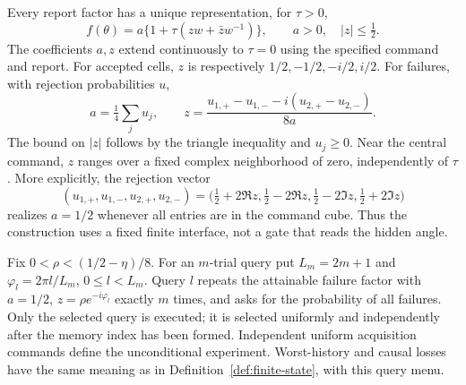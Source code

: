 \documentclass[11pt]{amsart}
\theoremstyle{definition}\newtheorem{definition}[theorem]{Definition}
\theoremstyle{remark}\newtheorem{remark}[theorem]{Remark}
\begin{document}
Every report factor has a unique representation, for $\tau>0$,
\begin{equation}\label{eq:circle-factor}
 f(\theta)=a\{1+\tau(z w+\bar z w^{-1})\},
 \qquad a>0,\quad |z|\le\tfrac12.
\end{equation}
The coefficients $a,z$ extend continuously to $\tau=0$ using the
specified command and report. For accepted cells, $z$ is respectively
$1/2,-1/2,-i/2,i/2$. For failures, with rejection probabilities $u$,
\begin{equation}\label{eq:circle-command-coordinates}
 a=\tfrac14\sum_j u_j,\qquad
 z=\frac{u_{1,+}-u_{1,-}-i(u_{2,+}-u_{2,-})}{8a}.
\end{equation}
The bound on $|z|$ follows by the triangle inequality and $u_j\ge0$.
Near the central command, $z$ ranges over a fixed complex neighborhood
of zero, independently of $\tau$. More explicitly, the rejection vector
\begin{equation}\label{eq:circle-right-inverse}
 (u_{1,+},u_{1,-},u_{2,+},u_{2,-})
 =\bigl(\tfrac12+2\Re z,\tfrac12-2\Re z,
        \tfrac12-2\Im z,\tfrac12+2\Im z\bigr)
\end{equation}
realizes $a=1/2$ whenever all entries are in the command cube.
Thus the construction uses a fixed finite interface, not a gate that
reads the hidden angle.

Fix $0<\rho<(1/2-\eta)/8$. For an $m$-trial query put
$L_m=2m+1$ and $\varphi_l=2\pi l/L_m$, $0\le l<L_m$.
Query $l$ repeats the attainable failure factor with
$a=1/2$, $z=\rho e^{-i\varphi_l}$ exactly $m$ times, and asks for
the probability of all failures. Only the selected query is executed;
it is selected uniformly and independently after the memory index has
been formed. Independent uniform acquisition commands define the
unconditional experiment. Worst-history and causal losses have the same
meaning as in Definition~\ref{def:finite-state}, with this query menu.
\end{document}
